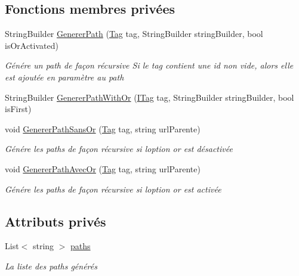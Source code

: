 \subsection*{Fonctions membres privées}
\begin{DoxyCompactItemize}
\item 
String\+Builder \mbox{\hyperlink{class_m_t_connect_agent_1_1_b_l_l_1_1_m_t_connect_client_ad38815a224cb788630db2a3eb09d84c7}{Generer\+Path}} (\mbox{\hyperlink{class_m_t_connect_agent_1_1_model_1_1_tag}{Tag}} tag, String\+Builder string\+Builder, bool is\+Or\+Activated)
\begin{DoxyCompactList}\small\item\em Génére un path de façon récursive Si le tag contient une id non vide, alors elle est ajoutée en paramètre au path \end{DoxyCompactList}\item 
String\+Builder \mbox{\hyperlink{class_m_t_connect_agent_1_1_b_l_l_1_1_m_t_connect_client_ae62829c685da54c7761cb892d292d190}{Generer\+Path\+With\+Or}} (\mbox{\hyperlink{interface_m_t_connect_agent_1_1_model_1_1_i_tag}{I\+Tag}} tag, String\+Builder string\+Builder, bool is\+First)
\item 
void \mbox{\hyperlink{class_m_t_connect_agent_1_1_b_l_l_1_1_m_t_connect_client_a49be318d688f99f3fe6596c74eba7ca1}{Generer\+Path\+Sans\+Or}} (\mbox{\hyperlink{class_m_t_connect_agent_1_1_model_1_1_tag}{Tag}} tag, string url\+Parente)
\begin{DoxyCompactList}\small\item\em Génére les paths de façon récursive si l\textquotesingle{}option or est désactivée \end{DoxyCompactList}\item 
void \mbox{\hyperlink{class_m_t_connect_agent_1_1_b_l_l_1_1_m_t_connect_client_a7e6917938b6629de25db52ed84dba6c5}{Generer\+Path\+Avec\+Or}} (\mbox{\hyperlink{class_m_t_connect_agent_1_1_model_1_1_tag}{Tag}} tag, string url\+Parente)
\begin{DoxyCompactList}\small\item\em Génére les paths de façon récursive si l\textquotesingle{}option or est activée \end{DoxyCompactList}\end{DoxyCompactItemize}
\subsection*{Attributs privés}
\begin{DoxyCompactItemize}
\item 
List$<$ string $>$ \mbox{\hyperlink{class_m_t_connect_agent_1_1_b_l_l_1_1_m_t_connect_client_ad1f188c1a4cd646e7630866643045d34}{paths}}
\begin{DoxyCompactList}\small\item\em La liste des paths générés \end{DoxyCompactList}\end{DoxyCompactItemize}


